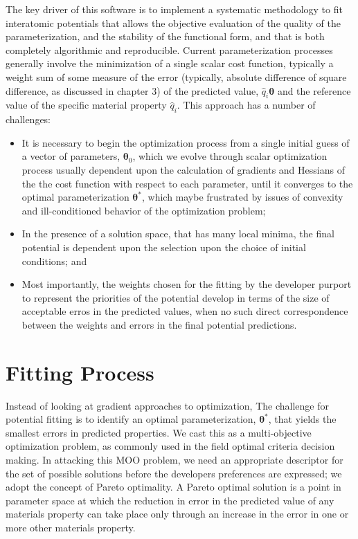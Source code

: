 The key driver of this software is to implement a systematic methodology to fit interatomic potentials that allows the objective evaluation of the quality of the parameterization, and the stability of the functional form, and that is both completely algorithmic and reproducible.  Current parameterization processes generally involve the minimization of a single scalar cost function, typically a weight sum of some measure of the error (typically, absolute difference of square difference, as discussed in chapter 3) of the predicted value, $\hat{q}_i{\bm{\theta}}$ and the reference value of the specific material property $\hat{q}_i$.  This approach has a number of challenges:
\begin{itemize}
	\item It is necessary to begin the optimization process from a single initial guess of a vector of parameters, $\bm{\theta}_0$, which we evolve through scalar optimization process usually dependent upon the calculation of gradients and Hessians of the the cost function with respect to each parameter, until it converges to the optimal parameterization $\bm{\theta}^*$, which maybe frustrated by issues of convexity and ill-conditioned behavior of the optimization problem;
	\item In the presence of a solution space, that has many local minima, the final potential is dependent upon the selection upon the choice of initial conditions; and
	\item Most importantly, the weights chosen for the fitting by the developer purport to represent the priorities of the potential develop in terms of the size of acceptable erros in the predicted values, when no such direct correspondence between the weights and errors in the final potential predictions.
\end{itemize}
\section{Fitting Process}

Instead of looking at gradient approaches to optimization,
The challenge for potential fitting is to identify an optimal parameterization, $\bm{\theta}^*$, that yields the smallest errors in predicted properties.  We cast this as a multi-objective optimization problem, as commonly used in the field optimal criteria decision making.  In attacking this MOO problem, we need an appropriate descriptor for the set of possible solutions before the developers preferences are expressed; we adopt the concept of Pareto optimality. A Pareto optimal solution is a point in parameter space at which the reduction in error in the predicted value of any materials property can take place only through an increase in the error in one or more other materials property.

